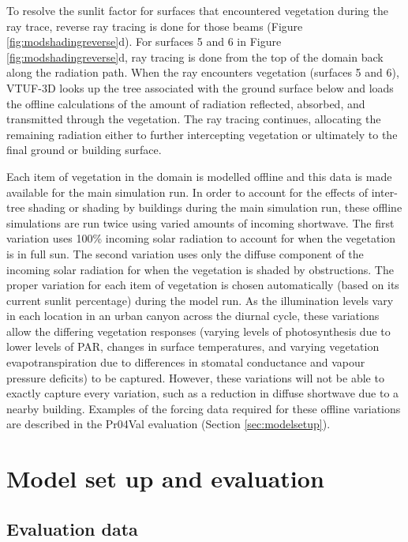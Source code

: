 \documentclass[final,3p,times,authoryear]{elsarticle}
\begin{document}
To resolve the sunlit factor for surfaces that encountered vegetation during the ray trace, reverse ray tracing is done for those beams (Figure \ref{fig:modshadingreverse}d). For surfaces 5 and 6 in Figure \ref{fig:modshadingreverse}d, ray tracing is done from the top of the domain back along the radiation path. When the ray encounters vegetation (surfaces 5 and 6), VTUF-3D looks up the tree associated with the ground surface below and loads the offline calculations of the amount of radiation reflected, absorbed, and transmitted through the vegetation. The ray tracing continues, allocating the remaining radiation either to further intercepting vegetation or ultimately to the final ground or building surface.

Each item of vegetation in the domain is modelled offline and this data is made available for the main simulation run. In order to account for the effects of inter-tree shading or shading by buildings during the main simulation run, these offline simulations are run twice using varied amounts of incoming shortwave. The first variation uses 100\% incoming solar radiation to account for when the vegetation is in full sun. The second variation uses only the diffuse component of the incoming solar radiation for when the vegetation is shaded by obstructions. The proper variation for each item of vegetation is chosen automatically (based on its current sunlit percentage) during the model run. As the illumination levels vary in each location in an urban canyon across the diurnal cycle, these variations allow the differing vegetation responses (varying levels of photosynthesis due to lower levels of PAR, changes in surface temperatures, and varying vegetation evapotranspiration due to differences in stomatal conductance and vapour pressure deficits) to be captured. However, these variations will not be able to exactly capture every variation, such as a reduction in diffuse shortwave due to a nearby building. Examples of the forcing data required for these offline variations are described in the Pr04Val evaluation (Section \ref{sec:modelsetup}).

\section{Model set up and evaluation}
\subsection{Evaluation data}\label{sec:Validation}
\end{document}
